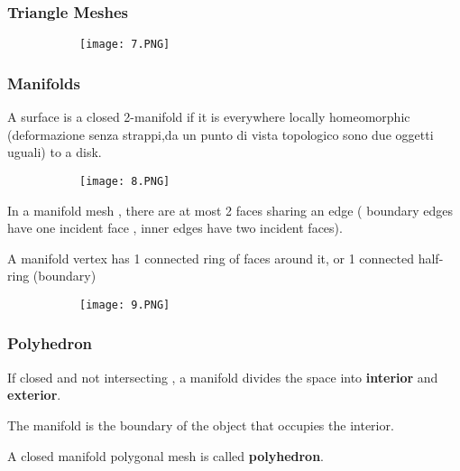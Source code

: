 \documentclass{article}
\begin{document}
\subsubsection{Triangle Meshes }

\begin{figure}[ht!]
  \centering
  \begin{subfigure}[b]{0.7\linewidth}
    \texttt{[image: 7.PNG]}
  \end{subfigure}
\end{figure}

\subsubsection{Manifolds}

A surface is a closed 2-manifold if it is everywhere locally homeomorphic (deformazione senza strappi,da un punto di vista topologico sono due oggetti uguali) to a disk.


\begin{figure}[ht!]
  \centering
  \begin{subfigure}[b]{0.3\linewidth}
    \texttt{[image: 8.PNG]}
  \end{subfigure}
\end{figure}


In a manifold mesh , there are at most 2 faces sharing an edge ( boundary edges have one incident face , inner edges have two incident faces).

A manifold vertex has 1 connected ring of faces around it, or 1 connected half-ring (boundary)

\begin{figure}[ht!]
  \centering
  \begin{subfigure}[b]{0.7\linewidth}
    \texttt{[image: 9.PNG]}
  \end{subfigure}
\end{figure}


\subsubsection{Polyhedron}

If closed and not intersecting , a manifold divides the space into \textbf{interior} and \textbf{exterior}.

The manifold is the boundary of the object that occupies the interior.

A closed manifold polygonal mesh is called \textbf{polyhedron}.
\end{document}
